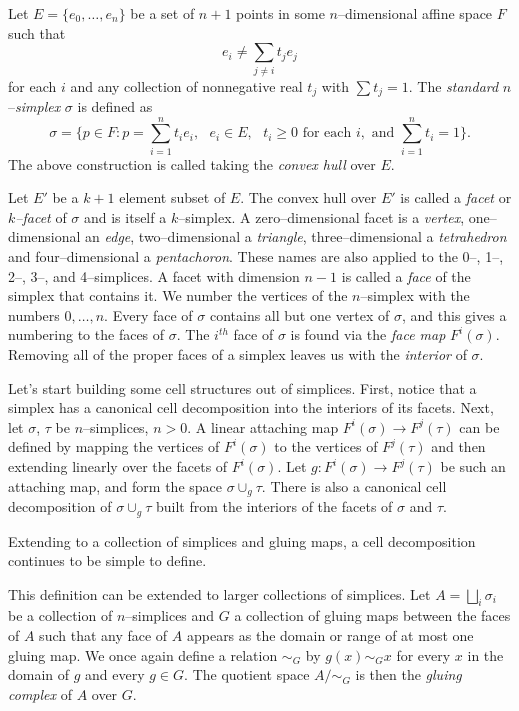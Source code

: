 \begin{defn}
	Let $E=\{e_0,\dots,e_n\}$ be a set of $n+1$ points in some $n$--dimensional affine space $F$ such that
	\[
	  e_i\neq \sum_{j\neq i}t_j e_j
	\]
	for each $i$ and any collection of nonnegative real $t_j$ with $\sum t_j=1$.
	The \emph{standard} $n$--\emph{simplex} $\sigma$ is defined as
	\[
	  \sigma = \{p\in F : p = \sum_{i=1}^n t_i e_i,\text{ } e_i\in E,\text{ } t_i\geq 0\text{ for each }i, \text{ and }\sum_{i=1}^n t_i=1\}.
	\]
	The above construction is called taking the \emph{convex hull} over $E$.
	
	Let $E'$ be a $k+1$ element subset of $E$.
	The convex hull over $E'$ is called a \emph{facet} or \emph{$k$--facet} of $\sigma$ and is itself a $k$--simplex.
	A zero--dimensional facet is a \emph{vertex}, one--dimensional an \emph{edge}, two--dimensional a \emph{triangle}, three--dimensional a \emph{tetrahedron} and four--dimensional a \emph{pentachoron}.
	These names are also applied to the 0--, 1--, 2--, 3--, and 4--simplices.
	A facet with dimension $n-1$ is called a \emph{face} of the simplex that contains it.
	We number the vertices of the $n$--simplex with the numbers $0,\dots,n$.
	Every face of $\sigma$ contains all but one vertex of $\sigma$, and this gives a numbering to the faces of $\sigma$.
	The $i^{th}$ face of $\sigma$ is found via the \emph{face map} $F^i(\sigma)$.
	Removing all of the proper faces of a simplex leaves us with the \emph{interior} of $\sigma$.
\end{defn}

Let's start building some cell structures out of simplices.
First, notice that a simplex has a canonical cell decomposition into the interiors of its facets.
Next, let $\sigma$, $\tau$ be $n$--simplices, $n>0$.
A linear attaching map $F^i(\sigma)\to F^j(\tau)$ can be defined by mapping the vertices of $F^i(\sigma)$ to the vertices of $F^j(\tau)$ and then extending linearly over the facets of $F^i(\sigma)$.
Let $g:F^i(\sigma)\to F^j(\tau)$ be such an attaching map, and form the space $\sigma\cup_g \tau$.
There is also a canonical cell decomposition of $\sigma\cup_g \tau$ built from the interiors of the facets of $\sigma$ and $\tau$.

Extending to a collection of simplices and gluing maps, a cell decomposition continues to be simple to define.


This definition can be extended to larger collections of simplices.
Let $A=\bigsqcup_i\sigma_i$ be a collection of $n$--simplices and $G$ a collection of gluing maps between the faces of $A$ such that any face of $A$ appears as the domain or range of at most one gluing map.
We once again define a relation $\sim_G$ by $g(x)\sim_G x$ for every $x$ in the domain of $g$ and every $g\in G$. 
The quotient space $A/\sim_G$ is then the \emph{gluing complex} of $A$ over $G$.

